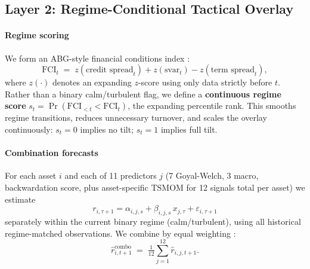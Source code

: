 \documentclass[11pt,letterpaper]{article}
\begin{document}
\subsection{Layer 2: Regime-Conditional Tactical Overlay}

\paragraph{Regime scoring}
We form an ABG-style financial conditions index \citep{Adrian2019}:
\begin{equation}
  \text{FCI}_t \;=\; z(\text{credit spread}_t) + z(\text{svar}_t) - z(\text{term spread}_t),
\end{equation}
where $z(\cdot)$ denotes an expanding $z$-score using only data strictly before $t$.
Rather than a binary calm/turbulent flag, we define a \textbf{continuous regime score}
$s_t = \Pr(\text{FCI}_{<t} < \text{FCI}_t)$, the expanding percentile rank. This
smooths regime transitions, reduces unnecessary turnover, and scales the overlay
continuously: $s_t = 0$ implies no tilt; $s_t = 1$ implies full tilt.

\paragraph{Combination forecasts}
For each asset $i$ and each of 11 predictors $j$ (7 Goyal-Welch, 3 macro, backwardation
score, plus asset-specific TSMOM for 12 signals total per asset) we estimate
\begin{equation}
  r_{i,\tau+1} = \alpha_{i,j,s} + \beta_{i,j,s}\,x_{j,\tau} + \varepsilon_{i,\tau+1}
\end{equation}
separately within the current binary regime (calm/turbulent), using all historical
regime-matched observations. We combine by equal weighting \citep{Rapach2010}:
\begin{equation}
  \hat{r}_{i,t+1}^{\text{combo}} \;=\; \tfrac{1}{12}\textstyle\sum_{j=1}^{12}\hat{r}_{i,j,t+1}.
\end{equation}
\end{document}
